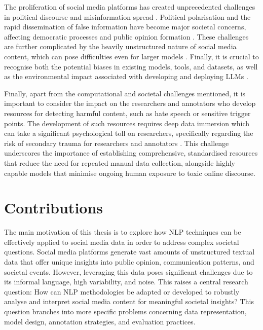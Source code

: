 The proliferation of social media platforms has created unprecedented challenges in political discourse and misinformation spread \cite{muhammed2022disaster}. Political polarisation and the rapid dissemination of false information have become major societal concerns, affecting democratic processes and public opinion formation \cite{allcott2017social}. These challenges are further complicated by the heavily unstructured nature of social media content, which can pose difficulties even for larger models \cite{eisenstein2013bad,gain-etal-2023-reference}. Finally, it is crucial to recognise both the potential biases in existing models, tools, and datasets, as well as the environmental impact associated with developing and deploying \acp{LLM} \cite{bender2021dangers}.

Finally, apart from the computational and societal challenges mentioned, it is important to consider the impact on the researchers and annotators who develop resources for detecting harmful content, such as hate speech or sensitive trigger points. The development of such resources requires deep data immersion which can take a significant psychological toll on researchers, specifically regarding the risk of secondary trauma for researchers and annotators \cite{kirk2022handling}. This challenge underscores the importance of establishing comprehensive, standardised resources that reduce the need for repeated manual data collection, alongside highly capable models that minimise ongoing human exposure to toxic online discourse.


\section{Contributions} \label{ch1:contributions}
 
The main motivation of this thesis is to explore how \ac{NLP} techniques can be effectively applied to social media data in order to address complex societal questions. Social media platforms generate vast amounts of unstructured textual data that offer unique insights into public opinion, communication patterns, and societal events. However, leveraging this data poses significant challenges due to its informal language, high variability, and noise. This raises a central research question: How can NLP methodologies be adapted or developed to robustly analyse and interpret social media content for meaningful societal insights? This question branches into more specific problems concerning data representation, model design, annotation strategies, and evaluation practices.

